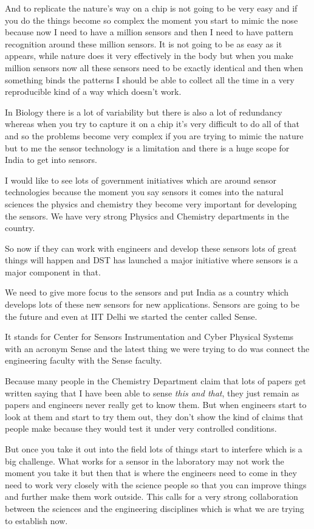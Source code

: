 \begin{multicols}{2}
And to replicate the nature’s way on a chip is not going to be very easy and if you do the things become so complex the moment you start to mimic the nose because now I need to have a million sensors and then I need to have pattern recognition around these million sensors. It is not going to be as easy as it appears, while nature does it very effectively in the body but when you make million sensors now all these sensors need to be exactly identical and then when something binds the patterns I should be able to collect all the time in a very reproducible kind of a way which doesn’t work.

In Biology there is a lot of variability but there is also a lot of redundancy whereas when you try to capture it on a chip it’s very difficult to do all of that and so the problems become very complex if you are trying to mimic the nature but to me the sensor technology is a limitation and there is a huge scope for India to get into sensors.

I would like to see lots of government initiatives which are around sensor technologies because the moment you say sensors it comes into the natural sciences the physics and chemistry they become very important for developing the sensors. We have very strong Physics and Chemistry departments in the country.

So now if they can work with engineers and develop these sensors lots of great things will happen and DST has launched a major initiative where sensors is a major component in that.

We need to give more focus to the sensors and put India as a country which develops lots of these new sensors for new applications.  Sensors are going to be the future and even at IIT Delhi we started the center called Sense. 

It stands for Center for Sensors Instrumentation and Cyber Physical Systems with an acronym Sense and the latest thing we were trying to do was connect the engineering faculty with the Sense faculty.

Because many people in the Chemistry Department claim that lots of papers get written saying that I have been able to sense \textit{this and that}, they just remain as papers and engineers never really get to know them. But when engineers start to look at them and start to try them out, they don’t show the kind of claims that people make because they would test it under very controlled conditions.

But once you take it out into the field lots of things start to interfere which is a big challenge. What works for a sensor in the laboratory may not work the moment you take it but then that is where the engineers need to come in they need to work very closely with the science people so that you can improve things and further make them work outside. This calls for a very strong collaboration between the sciences and the engineering disciplines which is what we are trying to establish now.


\end{multicols}
